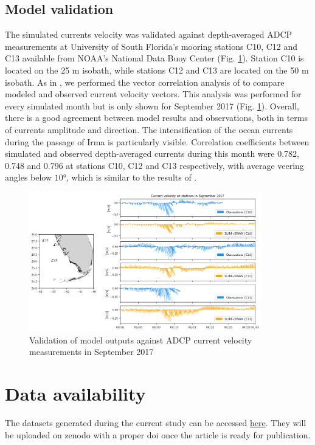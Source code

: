\documentclass[fleqn,10pt]{wlscirep}
\begin{document}
\subsection*{Model validation}
The simulated currents velocity was validated against depth-averaged ADCP measurements at University of South Florida's mooring stations C10, C12 and C13 available from NOAA's National Data Buoy Center (Fig. \ref{fig:validation}). Station C10 is located on the 25 m isobath, while stations C12 and C13 are located on the 50 m isobath. As in \cite{liu2020impacts}, we performed the vector correlation analysis of \citep{kundu1976ekman} to compare modeled and observed current velocity vectors. This analysis was performed for every simulated month but is only shown for September 2017 (Fig. \ref{fig:validation}). Overall, there is a good agreement between model results and observations, both in terms of currents amplitude and direction. The intensification of the ocean currents during the passage of Irma is particularly visible. Correlation coefficients between simulated and observed depth-averaged currents during this month were 0.782, 0.748 and 0.796 at stations C10, C12 and C13 respectively, with average veering angles below $10$°, which is similar to the results of \cite{liu2020impacts}.

\begin{figure}
    \centering
    \includegraphics[width=0.9\textwidth]{figures/validation_uv_map.png}
    \caption{Validation of model outputs against ADCP current velocity measurements in September 2017}
    \label{fig:validation}
\end{figure}


\section*{Data availability}
The datasets generated during the current study can be accessed \href{https://uclouvain-my.sharepoint.com/:f:/g/personal/thomas_dobbelaere_uclouvain_be/EuRwpuKKnytJvnkfshpBeA8BhwYU19c5sLEe8n3fnPmkjQ?e=pIUMxM}{here}. They will be uploaded on zenodo with a proper doi once the article is ready for publication.
\end{document}
